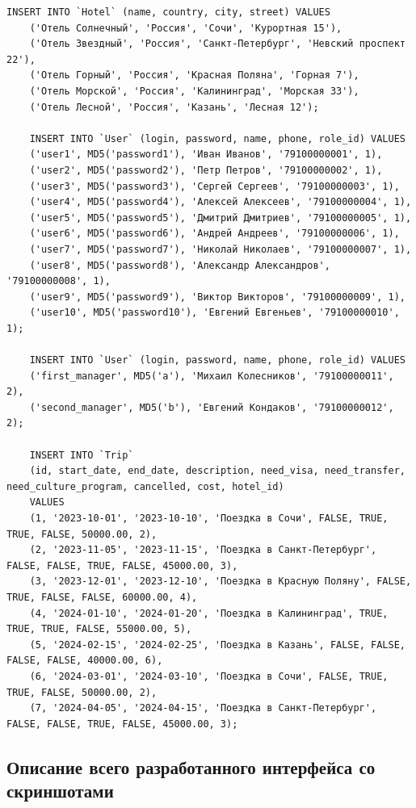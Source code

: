 \documentclass[a4paper,12pt]{article}
\begin{document}
\begin{lstlisting}[label={lst:sql-example}]
    INSERT INTO `Hotel` (name, country, city, street) VALUES
    ('Отель Солнечный', 'Россия', 'Сочи', 'Курортная 15'),
    ('Отель Звездный', 'Россия', 'Санкт-Петербург', 'Невский проспект 22'),
    ('Отель Горный', 'Россия', 'Красная Поляна', 'Горная 7'),
    ('Отель Морской', 'Россия', 'Калининград', 'Морская 33'),
    ('Отель Лесной', 'Россия', 'Казань', 'Лесная 12');
    
    INSERT INTO `User` (login, password, name, phone, role_id) VALUES
    ('user1', MD5('password1'), 'Иван Иванов', '79100000001', 1),
    ('user2', MD5('password2'), 'Петр Петров', '79100000002', 1),
    ('user3', MD5('password3'), 'Сергей Сергеев', '79100000003', 1),
    ('user4', MD5('password4'), 'Алексей Алексеев', '79100000004', 1),
    ('user5', MD5('password5'), 'Дмитрий Дмитриев', '79100000005', 1),
    ('user6', MD5('password6'), 'Андрей Андреев', '79100000006', 1),
    ('user7', MD5('password7'), 'Николай Николаев', '79100000007', 1),
    ('user8', MD5('password8'), 'Александр Александров', '79100000008', 1),
    ('user9', MD5('password9'), 'Виктор Викторов', '79100000009', 1),
    ('user10', MD5('password10'), 'Евгений Евгеньев', '79100000010', 1);
    
    INSERT INTO `User` (login, password, name, phone, role_id) VALUES
    ('first_manager', MD5('a'), 'Михаил Колесников', '79100000011', 2),
    ('second_manager', MD5('b'), 'Евгений Кондаков', '79100000012', 2);
    
    INSERT INTO `Trip` 
    (id, start_date, end_date, description, need_visa, need_transfer, need_culture_program, cancelled, cost, hotel_id) 
    VALUES
    (1, '2023-10-01', '2023-10-10', 'Поездка в Сочи', FALSE, TRUE, TRUE, FALSE, 50000.00, 2),
    (2, '2023-11-05', '2023-11-15', 'Поездка в Санкт-Петербург', FALSE, FALSE, TRUE, FALSE, 45000.00, 3),
    (3, '2023-12-01', '2023-12-10', 'Поездка в Красную Поляну', FALSE, TRUE, FALSE, FALSE, 60000.00, 4),
    (4, '2024-01-10', '2024-01-20', 'Поездка в Калининград', TRUE, TRUE, TRUE, FALSE, 55000.00, 5),
    (5, '2024-02-15', '2024-02-25', 'Поездка в Казань', FALSE, FALSE, FALSE, FALSE, 40000.00, 6),
    (6, '2024-03-01', '2024-03-10', 'Поездка в Сочи', FALSE, TRUE, TRUE, FALSE, 50000.00, 2),
    (7, '2024-04-05', '2024-04-15', 'Поездка в Санкт-Петербург', FALSE, FALSE, TRUE, FALSE, 45000.00, 3);        
\end{lstlisting}

\subsection{Описание всего разработанного интерфейса со скриншотами}
\end{document}
